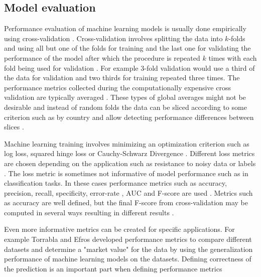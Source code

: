 \subsection{Model evaluation}
\label{sec:mlperf}

Performance evaluation of machine learning models is usually done empirically using cross-validation \parencite{formanApplestoApplesCrossValidationStudies,sokolovaSystematicAnalysisPerformance2009}. Cross-validation involves splitting the data into $k$-folds and using all but one of the folds for training and the last one for validating the performance of the model after which the procedure is repeated $k$ times with each fold being used for validation \parencite{cawleyOverfittingModelSelection}. For example $3$-fold validation would use a third of the data for validation and two thirds for training repeated three times. The performance metrics collected during the computationally expensive cross validation are typically averaged \parencite{cawleyOverfittingModelSelection}. These types of global averages might not be desirable and instead of random folds the data can be sliced according to some criterion such as by country and allow detecting performance differences between slices \parencite{breckMLTestScore2017a}.

Machine learning training involves minimizing an optimization criterion such as log loss, squared hinge loss or Cauchy-Schwarz Divergence \parencite{janochaLossFunctionsDeep2017}. Different loss metrics are chosen depending on the application such as resistance to noisy data or labels \parencite{janochaLossFunctionsDeep2017}. The loss metric is sometimes not informative of model performance such as in classification tasks. In these cases performance metrics such as accuracy, precision, recall, specificity, error-rate , AUC and F-score are used \parencite{sokolovaSystematicAnalysisPerformance2009,formanApplestoApplesCrossValidationStudies}. Metrics such as accuracy are well defined, but the final F-score from cross-validation may be computed in several ways resulting in different results \parencite{formanApplestoApplesCrossValidationStudies}.

Even more informative metrics can be created for specific applications. For example Torrabla and Efros \parencite*{torralbaUnbiasedLookDataset2011} developed performance metrics to compare different datasets and determine a "market value" for the data by using the generalization performance of machine learning models on the datasets. Defining correctness of the prediction is an important part when defining performance metrics \parencite{linMicrosoftCOCOCommon2014}



